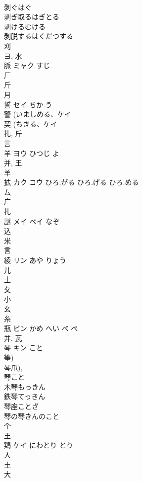 \documentclass[8pt]{extreport}
\begin{document}
\begin{CJK}{UTF8}{min}
\\	剥ぐはぐ
\\	剥ぎ取るはぎとる
\\	剥けるむける
\\	剥脱するはくだつする
\\	刈 
\\	ヨ, 水 
\\	脈	ミャク	すじ	
\\	厂 
\\	斤 
\\	月 
\\	誓	セイ	ちか.う	
\\	警 (いましめる、ケイ 
\\	契 (ちぎる、ケイ 
\\	扎, 斤 
\\	言 
\\	羊	ヨウ	ひつじ よ	
\\	并, 王 
\\	羊 
\\	拡	カク コウ	ひろ.がる ひろ.げる ひろ.める	
\\	厶 
\\	广 
\\	扎	
\\	謎	メイ ベイ	なぞ	
\\	込 
\\	米 
\\	言 
\\	綾	リン	あや りょう	
\\	儿 
\\	土 
\\	夂 
\\	小 
\\	幺 
\\	糸 
\\	瓶	ビン	かめ へい べ ぺ	
\\	并, 瓦 
\\	琴	キン	こと	
\\	箏) 
\\	琴爪), 
\\	琴こと
\\	木琴もっきん
\\	鉄琴てっきん
\\	琴座ことざ
\\	琴の琴きんのこと
\\	个 
\\	王 
\\	鶏	ケイ	にわとり とり	
\\	人 
\\	土 
\\	大 

\end{CJK}
\end{document}

